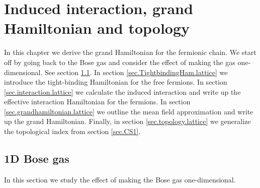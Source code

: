 
\chapter{Induced interaction, grand Hamiltonian and topology} %

\label{Chapter12} %

In this chapter we derive the grand Hamiltonian for the fermionic chain. We start off by going back to the Bose gas and consider the effect of making the gas one-dimensional. See section \ref{sec.1DBosegas}. In section \ref{sec.TightbindingHam.lattice} we introduce the tight-binding Hamiltonian for the free fermions. In section \ref{sec.interaction.lattice} we calculate the induced interaction and write up the effective interaction Hamiltonian for the fermions. In section \ref{sec.grandhamiltonian.lattice} we outline the mean field approximation and write up the grand Hamiltonian. Finally, in section \ref{sec.topology.lattice} we generalize the topological index from section \ref{sec.CS1}. 

\section{1D Bose gas} \label{sec.1DBosegas}
In this section we study the effect of making the Bose gas one-dimensional. 

